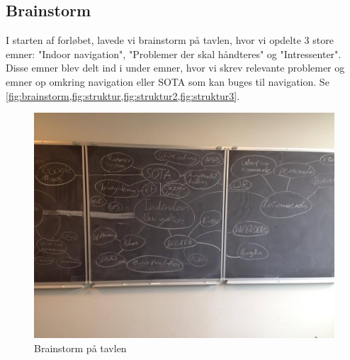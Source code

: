\documentclass[a4paper,12pt,oneside,article]{memoir}
\begin{document}
            \subsection{Brainstorm}
        I starten af forløbet, lavede vi brainstorm på tavlen, hvor vi opdelte 3 store  emner: "Indoor navigation", "Problemer der skal håndteres" og "Intressenter". Disse emner blev delt ind i under emner, hvor vi skrev relevante problemer og emner op omkring navigation eller SOTA som kan buges til navigation. Se \cref{fig:brainstorm,fig:struktur,fig:struktur2,fig:struktur3}.

        \begin{figure}
                \centering
                \includegraphics[width=\textwidth]{Images/1.jpg}
                \caption{Brainstorm på tavlen}
                \label{fig:brainstorm}
        \end{figure}
\end{document}

